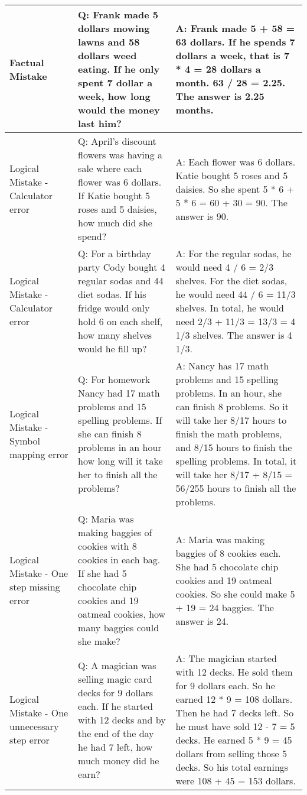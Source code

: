 \begin{center}
\begin{longtable}{|p{}|p{}|p{}|}
\midrule

Factual Mistake &Q: Frank made 5 dollars mowing lawns and 58 dollars weed eating. If he only spent 7 dollar a week, how long would the money last him? &A: Frank made 5 + 58 = 63 dollars. If he spends 7 dollars a week, that is 7 * 4 = 28 dollars a month. 63 / 28 = 2.25. The answer is 2.25 months. \\

\midrule

Logical Mistake - Calculator error &Q: April's discount flowers was having a sale where each flower was 6 dollars. If Katie bought 5 roses and 5 daisies, how much did she spend? &A: Each flower was 6 dollars. Katie bought 5 roses and 5 daisies. So she spent 5 * 6 + 5 * 6 = 60 + 30 = 90. The answer is 90. \\

\midrule

Logical Mistake - Calculator error &Q: For a birthday party Cody bought 4 regular sodas and 44 diet sodas. If his fridge would only hold 6 on each shelf, how many shelves would he fill up? &A: For the regular sodas, he would need 4 / 6 = 2/3 shelves. For the diet sodas, he would need 44 / 6 = 11/3 shelves. In total, he would need 2/3 + 11/3 = 13/3 = 4 1/3 shelves. The answer is 4 1/3. \\

\midrule

Logical Mistake - Symbol mapping error &Q: For homework Nancy had 17 math problems and 15 spelling problems. If she can finish 8 problems in an hour how long will it take her to finish all the problems? &A: Nancy has 17 math problems and 15 spelling problems. In an hour, she can finish 8 problems. So it will take her 8/17 hours to finish the math problems, and 8/15 hours to finish the spelling problems. In total, it will take her 8/17 + 8/15 = 56/255 hours to finish all the problems. \\

\midrule

Logical Mistake - One step missing error &Q: Maria was making baggies of cookies with 8 cookies in each bag. If she had 5 chocolate chip cookies and 19 oatmeal cookies, how many baggies could she make? &A: Maria was making baggies of 8 cookies each. She had 5 chocolate chip cookies and 19 oatmeal cookies. So she could make 5 + 19 = 24 baggies. The answer is 24. \\

\midrule

Logical Mistake - One unnecessary step error &Q: A magician was selling magic card decks for 9 dollars each. If he started with 12 decks and by the end of the day he had 7 left, how much money did he earn? &A: The magician started with 12 decks. He sold them for 9 dollars each. So he earned 12 * 9 = 108 dollars. Then he had 7 decks left. So he must have sold 12 - 7 = 5 decks. He earned 5 * 9 = 45 dollars from selling those 5 decks. So his total earnings were 108 + 45 = 153 dollars. \\


\end{longtable}
\end{center}
